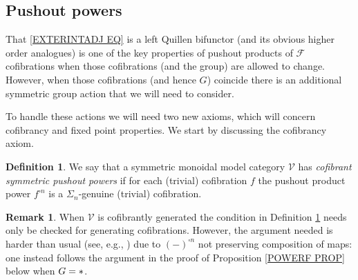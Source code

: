 \documentclass[a4paper,10pt
,draft
]{article}%
\numberwithin{equation}{section}
\numberwithin{figure}{section}
\theoremstyle{definition} %
\newtheorem{definition}[equation]{Definition}%
\newtheorem{remark}[equation]{Remark}%
\newcommand{\V}{\ensuremath{\mathcal V}}
\newcommand{\1}{\ensuremath{\mathbbm 1}}%
\begin{document}
\subsection{Pushout powers}\label{PUSHPOW SEC}

That \eqref{EXTERINTADJ EQ} is a left Quillen bifunctor (and its obvious higher order analogues) is one of the key properties of pushout products of $\mathcal{F}$ cofibrations when those cofibrations (and the group) are allowed to change. However, when those cofibrations (and hence $G$) coincide there is an additional symmetric group action that  we will need to consider.

To handle these actions we will need two new axioms, 
which will concern cofibrancy and fixed point properties. We start by discussing the cofibrancy axiom.


\begin{definition}\label{COFSYMPUSHPOW}
	We say that a symmetric monoidal model category $\mathcal{V}$ has 
	\textit{cofibrant symmetric pushout powers}
	if for each (trivial) cofibration $f$ the pushout product power 
	$f^{\square n}$ is a $\Sigma_n$-genuine 
	(trivial) cofibration.%
\end{definition}


\begin{remark}
When $\mathcal{V}$ is cofibrantly generated
the condition in Definition \ref{COFSYMPUSHPOW} needs only be checked for generating cofibrations. 
However, the argument needed is harder than usual
(see, e.g., \cite[Lemma 2.1.20]{Ho98}) due to $(-)^{\square n}$ not preserving composition of maps:
one instead follows the argument in the proof of 
Proposition \ref{POWERF PROP} below when $G=\**$.
\end{remark}
\end{document}
